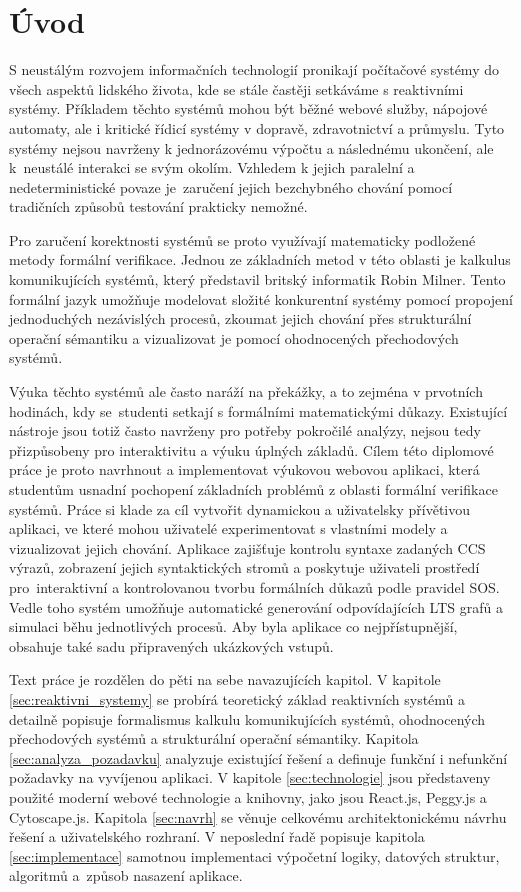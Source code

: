 \chapter{Úvod}
\label{sec:Introduction}
S neustálým rozvojem informačních technologií pronikají počítačové systémy do všech aspektů lidského života, kde se stále častěji setkáváme s reaktivními systémy.
Příkladem těchto systémů mohou být běžné webové služby, nápojové automaty, ale i kritické řídicí systémy v dopravě, zdravotnictví a průmyslu. 
Tyto systémy nejsou navrženy k jednorázovému výpočtu a následnému ukončení, ale k~neustálé interakci se svým okolím. 
Vzhledem k jejich paralelní a nedeterministické povaze je~zaručení jejich bezchybného chování pomocí tradičních způsobů testování prakticky nemožné. 

Pro zaručení korektnosti systémů se proto využívají matematicky podložené metody formální verifikace. 
Jednou ze základních metod v této oblasti je kalkulus komunikujících systémů, který představil britský informatik Robin Milner. 
Tento formální jazyk umožňuje modelovat složité konkurentní systémy pomocí propojení jednoduchých nezávislých procesů, zkoumat jejich chování přes strukturální operační sémantiku a vizualizovat je pomocí ohodnocených přechodových systémů.

Výuka těchto systémů ale často naráží na překážky, a to zejména v prvotních hodinách, kdy se~studenti setkají s formálními matematickými důkazy. 
Existující nástroje jsou totiž často navrženy pro potřeby pokročilé analýzy, nejsou tedy přizpůsobeny pro interaktivitu a výuku úplných základů.
Cílem této diplomové práce je proto navrhnout a implementovat výukovou webovou aplikaci, která studentům usnadní pochopení základních problémů z oblasti formální verifikace systémů. 
Práce si klade za cíl vytvořit dynamickou a uživatelsky přívětivou aplikaci, ve které mohou uživatelé experimentovat s vlastními modely a vizualizovat jejich chování. 
Aplikace zajišťuje kontrolu syntaxe zadaných CCS výrazů, zobrazení jejich syntaktických stromů a poskytuje uživateli prostředí pro~interaktivní a kontrolovanou tvorbu formálních důkazů podle pravidel SOS. 
Vedle toho systém umožňuje automatické generování odpovídajících LTS grafů a simulaci běhu jednotlivých procesů. 
Aby byla aplikace co nejpřístupnější, obsahuje také sadu připravených ukázkových vstupů.

Text práce je rozdělen do pěti na sebe navazujících kapitol. 
V kapitole \ref{sec:reaktivni_systemy} se probírá teoretický základ reaktivních systémů a detailně popisuje formalismus kalkulu komunikujících systémů, ohodnocených přechodových systémů a strukturální operační sémantiky. 
Kapitola \ref{sec:analyza_pozadavku} analyzuje existující řešení a definuje funkční i nefunkční požadavky na vyvíjenou aplikaci. 
V kapitole \ref{sec:technologie} jsou představeny použité moderní webové technologie a knihovny, jako jsou React.js, Peggy.js a Cytoscape.js. 
Kapitola \ref{sec:navrh} se věnuje celkovému architektonickému návrhu řešení a uživatelského rozhraní.
V neposlední řadě popisuje kapitola \ref{sec:implementace} samotnou implementaci výpočetní logiky, datových struktur, algoritmů a~způsob nasazení aplikace.

